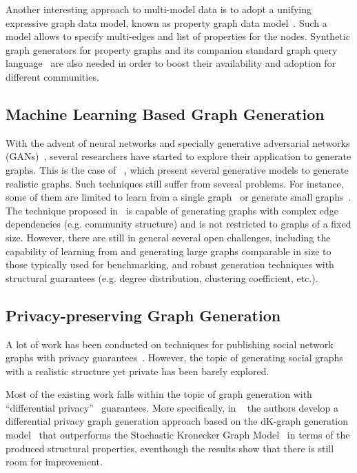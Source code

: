 Another interesting approach to multi-model data is to adopt a unifying
expressive graph data model, known as property graph data
model~\cite{BFVY18}. Such a model allows to specify multi-edges and list of
properties for the nodes. Synthetic graph generators for property graphs and its
companion standard graph query language~\cite{Angles18,AnglesABBFGLPPS18} are also needed in order to boost
their availability and adoption for different communities.


\subsection{Machine Learning Based Graph Generation}

With the advent of neural networks and specially generative adversarial networks
(GANs)~\cite{goodfellow2014generative}, several researchers have started to
explore their application to generate graphs. This is the case of
~\cite{kipf2016variational,grover2018graphite,simonovsky2018graphvae,li2018learning,you2018graphrnn},
which present several generative models to generate realistic graphs.  Such
techniques still suffer from several problems. For instance, some of them are
limited to learn from a single
graph~\cite{kipf2016variational,grover2018graphite} or generate small
graphs~\cite{simonovsky2018graphvae,li2018learning,you2018graphrnn}. The
technique proposed in~\cite{you2018graphrnn} is capable of generating graphs
with complex edge dependencies (e.g. community structure) and is not restricted
to graphs of a fixed size. However, there are still in general several open
challenges, including the capability of learning from and generating large graphs comparable
in size to those typically used for benchmarking, and robust generation
techniques with structural guarantees (e.g. degree distribution, clustering
coefficient, etc.).

\subsection{Privacy-preserving Graph Generation}

A lot of work has been conducted on techniques for publishing social network
graphs with privacy guarantees~\cite{wu2010survey}. However, the topic of
generating social graphs with a realistic structure yet private has been barely explored.  

Most of the existing work falls within the topic of graph generation with ``differential
privacy''~\cite{dwork2009differential} guarantees. More specifically, in
~\cite{wang2013preserving} the authors develop a differential privacy graph
generation approach based on the dK-graph generation
model~\cite{mahadevan2006systematic} that outperforms the Stochastic Kronecker
Graph Model~\cite{LeskovecCKF05} in terms of the produced structural properties,
eventhough the results show that there is still room for improvement.

